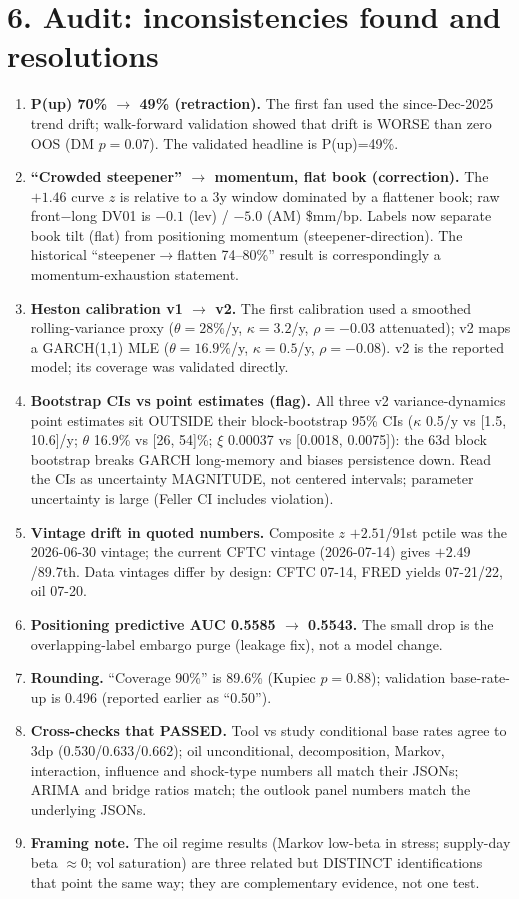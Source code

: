 \documentclass[10pt,a4paper]{article}
\newcommand{\sect}[1]{\section*{\color{bigorange}#1}}
\begin{document}
\sect{6. Audit: inconsistencies found and resolutions}
\begin{enumerate}\itemsep2pt
\item \textbf{P(up) 70\% $\to$ 49\% (retraction).} The first fan used the since-Dec-2025
trend drift; walk-forward validation showed that drift is WORSE than zero OOS
(DM $p=0.07$). The validated headline is P(up)=49\%.
\item \textbf{``Crowded steepener'' $\to$ momentum, flat book (correction).} The $+1.46$
curve $z$ is relative to a 3y window dominated by a flattener book; raw front$-$long
DV01 is $-0.1$ (lev) / $-5.0$ (AM) \$mm/bp. Labels now separate book tilt (flat) from
positioning momentum (steepener-direction). The historical ``steepener$\to$flatten
74--80\%'' result is correspondingly a momentum-exhaustion statement.
\item \textbf{Heston calibration v1 $\to$ v2.} The first calibration used a smoothed
rolling-variance proxy ($\theta=28\%$/y, $\kappa=3.2$/y, $\rho=-0.03$ attenuated); v2
maps a GARCH(1,1) MLE ($\theta=16.9\%$/y, $\kappa=0.5$/y, $\rho=-0.08$). v2 is the
reported model; its coverage was validated directly.
\item \textbf{Bootstrap CIs vs point estimates (flag).} All three v2 variance-dynamics
point estimates sit OUTSIDE their block-bootstrap 95\% CIs ($\kappa$ 0.5/y vs
[1.5, 10.6]/y; $\theta$ 16.9\% vs [26, 54]\%; $\xi$ 0.00037 vs [0.0018, 0.0075]):
the 63d block bootstrap breaks GARCH long-memory and biases persistence down. Read the
CIs as uncertainty MAGNITUDE, not centered intervals; parameter uncertainty is large
(Feller CI includes violation).
\item \textbf{Vintage drift in quoted numbers.} Composite $z$ $+2.51$/91st pctile was
the 2026-06-30 vintage; the current CFTC vintage (2026-07-14) gives $+2.49$/89.7th.
Data vintages differ by design: CFTC 07-14, FRED yields 07-21/22, oil 07-20.
\item \textbf{Positioning predictive AUC 0.5585 $\to$ 0.5543.} The small drop is the
overlapping-label embargo purge (leakage fix), not a model change.
\item \textbf{Rounding.} ``Coverage 90\%'' is 89.6\% (Kupiec $p=0.88$); validation
base-rate-up is 0.496 (reported earlier as ``0.50'').
\item \textbf{Cross-checks that PASSED.} Tool vs study conditional base rates agree to
3dp (0.530/0.633/0.662); oil unconditional, decomposition, Markov, interaction,
influence and shock-type numbers all match their JSONs; ARIMA and bridge ratios match;
the outlook panel numbers match the underlying JSONs.
\item \textbf{Framing note.} The oil regime results (Markov low-beta in stress;
supply-day beta $\approx0$; vol saturation) are three related but DISTINCT
identifications that point the same way; they are complementary evidence, not one test.
\end{enumerate}
\end{document}
